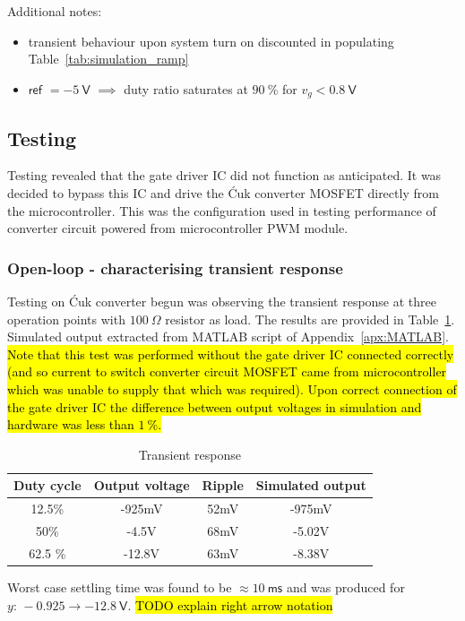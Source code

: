 Additional notes:
\begin{itemize}
    \item transient behaviour upon system turn on discounted in populating Table~\ref{tab:simulation_ramp}
    \item $\textsf{ref } = \minus 5 \ \mathsf{V}$ $\implies$ duty ratio saturates at $90 \ \mathsf{\%}$ for $v_g < 0.8 \ \mathsf{V}$
\end{itemize}
\subsection{Testing}
Testing revealed that the gate driver IC did not function as anticipated. It was decided to bypass this IC and drive the \'{C}uk converter MOSFET directly from the microcontroller. This was the configuration used in testing performance of converter circuit powered from microcontroller PWM module.
\subsubsection{Open-loop - characterising transient response}
Testing on \'{C}uk converter begun was observing the transient response at three operation points with $100 \ \mathsf{\Omega}$ resistor as load. The results are provided in Table~\ref{tab:trans}. Simulated output extracted from \textsf{MATLAB} script of Appendix~\ref{apx:MATLAB}. \hl{Note that this test was performed without the gate driver IC connected correctly (and so current to switch converter circuit MOSFET came from microcontroller which was unable to supply that which was required). Upon correct connection of the gate driver IC the difference between output voltages in simulation and hardware was less than $1 \ \mathsf{\%}$.}
\begin{table}[H]
\centering
\begin{tabular}{|c|c|c||c|}
\hline
Duty cycle  & Output voltage & Ripple  & Simulated output \\ \hline \hline
12.5\%      & -925mV         & 52mV     & -975mV \\ \hline
50\%        & -4.5V          & 68mV     & -5.02V\\\hline
62.5 \%     & -12.8V         & 63mV     & -8.38V\\ \hline
\end{tabular}
\caption{Transient response}
\label{tab:trans}
\end{table}
Worst case settling time was found to be $\approx 10 \ \mathsf{ms}$ and was produced for $y \text{: } \minus 0.925 \rightarrow \minus 12.8 \ \mathsf{V}$. \hl{TODO explain right arrow notation}

